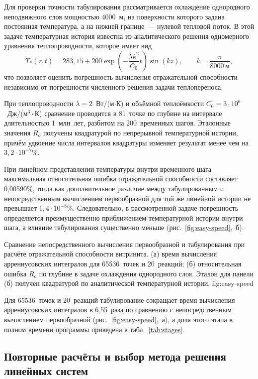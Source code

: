 Для проверки точности табулирования рассматривается охлаждение однородного неподвижного слоя мощностью 4000~м, на поверхности которого задана постоянная температура, а на нижней границе~--- нулевой тепловой поток. В этой задаче температурная история известна из аналитического решения одномерного уравнения теплопроводности, которое имеет вид
\begin{equation}
 T_*(z,t) = 283{,}15 + 200\exp\left(-\frac{\lambda k^2}{C_0}t\right)\sin(kz),
 \qquad k = \frac{\pi}{8000\,\text{м}},
\end{equation}
что позволяет оценить погрешность вычисления отражательной способности независимо от погрешности численного решения задачи теплопереноса.

При теплопроводности $\lambda=2$~Вт/(м$\cdot$К) и объёмной теплоёмкости $C_0=3\cdot10^6$~Дж/(м$^3\cdot$К) сравнение проводится в 81~точке по глубине на интервале длительностью 1~млн~лет, разбитом на 200~временных шагов. Эталонные значения $R_o$ получены квадратурой по непрерывной температурной истории, причём удвоение числа интервалов квадратуры изменяет результат менее чем на $3{,}2\cdot10^{-7}\%$.

При линейном представлении температуры внутри временного шага максимальная относительная ошибка отражательной способности составляет 0,00590\%, тогда как дополнительное различие между табулированным и непосредственным вычислением первообразной для той же линейной истории не превышает $1{,}4\cdot10^{-8}\%$. Следовательно, в рассмотренной задаче погрешность определяется преимущественно приближением температурной истории внутри шага, а влияние табулирования существенно меньше (рис.~\ref{fig:easy-speed},~б).

 {Сравнение непосредственного вычисления первообразной и табулирования при расчёте отражательной способности витринита. (а) время вычисления аррениусовских интегралов для 65536~точек и 20~реакций; (б) относительная ошибка $R_o$ по глубине в задаче охлаждения однородного слоя. Эталон для панели (б) получен квадратурой по аналитической температурной истории.} {fig:easy-speed}

Для 65536~точек и 20~реакций табулирование сокращает время вычисления аррениусовских интегралов в 6,55~раза по сравнению с непосредственным вычислением первообразной (рис.~\ref{fig:easy-speed},~а), а доля этого этапа в полном времени программы приведена в табл.~\ref{tab:stages}.

\subsection{Повторные расчёты и выбор метода решения линейных систем}

